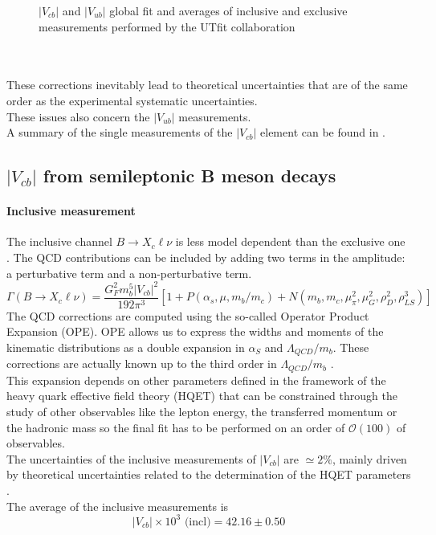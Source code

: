 \begin{minipage}{\linewidth}
\begin{minipage}{0.55\linewidth}
\begin{figure}[H]
            \caption{$|V_{cb}|$ and $|V_{ub}|$ global fit and averages of inclusive and exclusive measurements performed by the UTfit collaboration \cite{Bona2023NewScheme}}
            \label{fig:vcbvub}
        \end{figure}
    \end{minipage}
\end{minipage}\\
\\
These corrections inevitably lead to theoretical uncertainties that are of the same order as the experimental systematic uncertainties.\\
These issues also concern the $|V_{ub}|$ measurements.\\
A summary of the single measurements of the $|V_{cb}|$ element can be found in \cite{PDG_2022}.
\subsection{$|V_{cb}|$ from semileptonic B meson decays}
\paragraph*{Inclusive measurement}
The inclusive channel $B\to X_c \ell \nu$ is less model dependent than the exclusive one \cite{Smith2005DeterminationSpectra}.
The QCD contributions can be included by adding two terms in the amplitude: a perturbative term and a non-perturbative term.
\begin{equation}
    \Gamma(B\rightarrow X_c\ell\nu)=\frac{G_{F}^{2}m_{b}^{5}|V_{c b}|^{2}}{192\pi^{3}}[1+P(\alpha_{s},\mu,m_{b}/m_{c})+N(m_b,m_c,\mu_\pi^2,\mu_G^2,\rho_D^2,\rho_{LS}^3)]
\end{equation}
The QCD corrections are computed using the so-called Operator Product Expansion (OPE). OPE allows us to express the widths and moments of the kinematic distributions as a double expansion in $\alpha_S$ and $\Lambda_{QCD}/m_b$. These corrections are actually known up to the third order in $\Lambda_{QCD}/m_b$ \cite{Alberti2016TheVcb}.\\
This expansion depends on other parameters defined in the framework of the heavy quark effective field theory (HQET) that can be constrained through the study of other observables like the lepton energy, the transferred momentum or the hadronic mass \cite{Smith2005DeterminationSpectra} so the final fit has to be performed on an order of $\mathcal{O}(100)$ of observables.\\
The uncertainties of the inclusive measurements of $|V_{cb}|$ are  $\simeq 2\%$, mainly driven by theoretical uncertainties related to the determination of the HQET parameters \cite{Alberti2016TheVcb}.\\
The average of the inclusive measurements is \cite{Bordone2021ThreeVcb}
\begin{equation}
    |V_{cb}|\times10^3\text{ (incl)}=42.16\pm 0.50
\end{equation}

